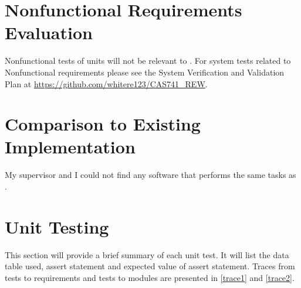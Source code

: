 \documentclass[12pt, titlepage]{article}
\begin{document}
\section{Nonfunctional Requirements Evaluation}

Nonfunctional tests of units will not be relevant to \progname. 
For system tests related to Nonfunctional requirements please see the System 
Verification and Validation Plan at 
\url{https://github.com/whitere123/CAS741_REW}. 
	
\section{Comparison to Existing Implementation}	

My supervisor and I could not find any software that performs the same tasks as 
\progname. 

\section{Unit Testing} \label{unitest}

This section will provide a brief summary of each unit test. It will list the 
data table used, assert statement and expected value of assert statement. 
Traces from tests to requirements and tests to modules are presented in 
\ref{trace1} and \ref{trace2}. 
\end{document}
